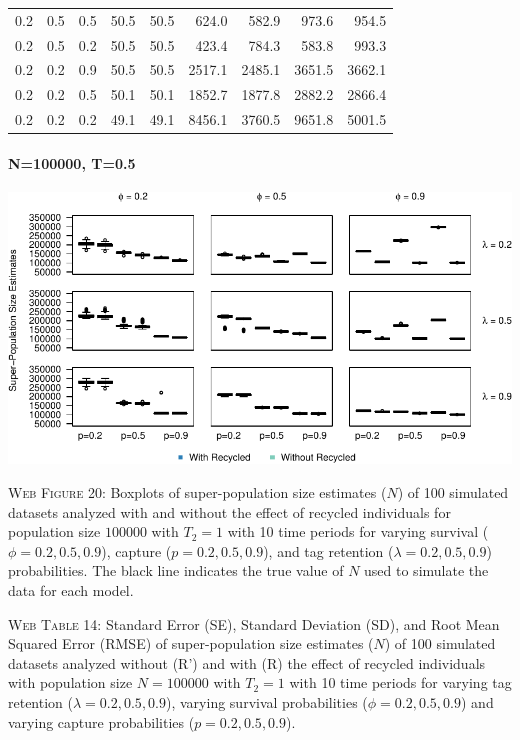 \documentclass[]{article}
\let\oldparagraph\paragraph
\renewcommand{\paragraph}[1]{\oldparagraph{#1}\mbox{}}
\begin{document}
\begin{table}[ht]
{\begin{tabular}{rrrrrrrrr}
  0.2 & 0.5 & 0.5 & 50.5 & 50.5 & 624.0 & 582.9 & 973.6 & 954.5 \\ 
  0.2 & 0.5 & 0.2 & 50.5 & 50.5 & 423.4 & 784.3 & 583.8 & 993.3 \\ 
  0.2 & 0.2 & 0.9 & 50.5 & 50.5 & 2517.1 & 2485.1 & 3651.5 & 3662.1 \\ 
  0.2 & 0.2 & 0.5 & 50.1 & 50.1 & 1852.7 & 1877.8 & 2882.2 & 2866.4 \\ 
  0.2 & 0.2 & 0.2 & 49.1 & 49.1 & 8456.1 & 3760.5 & 9651.8 & 5001.5 \\ 
   \hline
\end{tabular}
}
\endgroup
\end{table}

\newpage

\paragraph{N=100000, T=0.5}\label{n100000-t0.5-3}

\includegraphics{Appendix_files/figure-latex/figure20_superN_GJSTL2-1.pdf}

\textsc{Web Figure 20:} Boxplots of super-population size estimates
(\(N\)) of 100 simulated datasets analyzed with and without the effect
of recycled individuals for population size \(100000\) with \(T_2=1\)
with 10 time periods for varying survival (\(\phi=0.2,0.5,0.9\)),
capture (\(p=0.2,0.5,0.9\)), and tag retention (\(\lambda=0.2,0.5,0.9\))
probabilities. The black line indicates the true value of \(N\) used to
simulate the data for each model.

\textsc{Web Table 14:} Standard Error (SE), Standard Deviation (SD), and
Root Mean Squared Error (RMSE) of super-population size estimates
(\(N\)) of 100 simulated datasets analyzed without (R') and with (R) the
effect of recycled individuals with population size \(N=100000\) with
\(T_2=1\) with 10 time periods for varying tag retention
(\(\lambda=0.2,0.5,0.9\)), varying survival probabilities
(\(\phi=0.2,0.5,0.9\)) and varying capture probabilities
(\(p=0.2,0.5,0.9\)).
\end{document}

